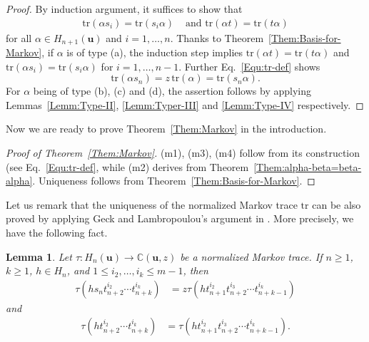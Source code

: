 \documentclass[a4paper, oneside]{amsart}
\numberwithin{equation}{section}
\newtheorem{lemma}[equation]{Lemma}
\theoremstyle{definition}
\theoremstyle{remark}
\begin{document}
\begin{proof}By induction argument, it suffices to show that
\begin{align*}
  \mathrm{tr}(\alpha s_i)=\mathrm{tr}(s_i\alpha)&\text{ and }
  \mathrm{tr}(\alpha t)=\mathrm{tr}(t\alpha)
\end{align*}
for all $\alpha\in H_{n+1}(\boldsymbol{u})$ and $i=1,\ldots,n$.
Thanks to Theorem~\ref{Them:Basis-for-Markov}, if $\alpha$ is of type (a),  the induction step implies $\mathrm{tr}(\alpha t)=\mathrm{tr}(t\alpha)$ and $\mathrm{tr}(\alpha s_i)=\mathrm{tr}(s_i\alpha)$ for $i=1, \ldots, n-1$. Further Eq.~\eqref{Equ:tr-def} shows
\begin{equation*}
  \mathrm{tr}(\alpha s_n)=z\mathrm{\,tr}(\alpha)=\mathrm{tr}(s_n\alpha).
\end{equation*}
For $\alpha$ being of type (b), (c) and (d), the assertion follows by applying Lemmas~\ref{Lemm:Type-II}, \ref{Lemm:Typer-III} and  \ref{Lemm:Type-IV} respectively.
\end{proof}

Now we are ready to prove Theorem~\ref{Them:Markov} in the introduction.
\begin{proof}[Proof of Theorem~\ref{Them:Markov}] (m1), (m3), (m4) follow from its construction (see Eq.~\eqref{Equ:tr-def}, while (m2) derives from Theorem~\ref{Them:alpha-beta=beta-alpha}.  Uniqueness follows from Theorem~\ref{Them:Basis-for-Markov}.\end{proof}


Let us remark that the uniqueness of the normalized Markov trace $\mathrm{tr}$ can be also proved by applying Geck and Lambropoulou's argument in \cite[Lemma~4.2]{GL}.  More precisely, we have the following fact.

\begin{lemma}Let $\tau: H_n(\boldsymbol{u})\rightarrow\mathbb{C}(\boldsymbol{u},z)$ be a normalized Markov trace.  If $n\geq 1$, $k\geq 1$, $h\in H_{n}$, and $1 \leq i_2,\ldots, i_{k}\leq m-1$, then
   \begin{align*}
     \tau(hs_{n}t_{n+2}^{i_2}\cdots t_{n+k}^{i_k})&=z\tau(ht_{n+1}^{i_2}t_{n+2}^{i_3}\cdots t_{n+k-1}^{i_k})
   \end{align*}
   and
   \begin{align*}
     \tau(ht_{n+2}^{i_2}\cdots t_{n+k}^{i_k})&=\tau(ht_{n+1}^{i_2}t_{n+2}^{i_3}\cdots t_{n+k-1}^{i_k}).
   \end{align*}
   \end{lemma}
\end{document}
